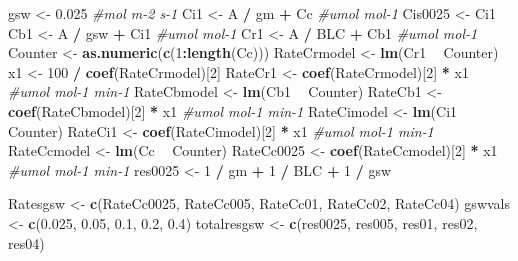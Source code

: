 \documentclass[
]{krantz}
\makeatletter
\newenvironment{Shaded}{\begin{snugshade}}{\end{snugshade}}
\newcommand{\CommentTok}[1]{\textcolor[rgb]{0.56,0.35,0.01}{\textit{#1}}}
\newcommand{\DecValTok}[1]{\textcolor[rgb]{0.00,0.00,0.81}{#1}}
\newcommand{\FloatTok}[1]{\textcolor[rgb]{0.00,0.00,0.81}{#1}}
\newcommand{\KeywordTok}[1]{\textcolor[rgb]{0.13,0.29,0.53}{\textbf{#1}}}
\newcommand{\NormalTok}[1]{#1}
\newcommand{\OperatorTok}[1]{\textcolor[rgb]{0.81,0.36,0.00}{\textbf{#1}}}
\newcommand{\StringTok}[1]{\textcolor[rgb]{0.31,0.60,0.02}{#1}}
\newenvironment{kframe}{%
\medskip{}
\setlength{\fboxsep}{.8em}
 \def\at@end@of@kframe{}%
 \ifinner\ifhmode%
  \def\at@end@of@kframe{\end{minipage}}%
  \begin{minipage}{\columnwidth}%
 \fi\fi%
 \def\FrameCommand##1{\hskip\@totalleftmargin \hskip-\fboxsep
 \colorbox{shadecolor}{##1}\hskip-\fboxsep
     \hskip-\linewidth \hskip-\@totalleftmargin \hskip\columnwidth}%
 \MakeFramed {\advance\hsize-\width
   \@totalleftmargin\z@ \linewidth\hsize
   \@setminipage}}%
 {\par\unskip\endMakeFramed%
 \at@end@of@kframe}
\renewenvironment{Shaded}{\begin{kframe}}{\end{kframe}}
\makeatother
\begin{document}
\begin{Shaded}
\begin{Highlighting}[]
\NormalTok{gsw <-}\StringTok{ }\FloatTok{0.025} \CommentTok{#mol m-2 s-1}
\NormalTok{Ci1 <-}\StringTok{ }\NormalTok{A }\OperatorTok{/}\StringTok{ }\NormalTok{gm }\OperatorTok{+}\StringTok{ }\NormalTok{Cc }\CommentTok{#umol mol-1}
\NormalTok{Cis0025 <-}\StringTok{ }\NormalTok{Ci1}
\NormalTok{Cb1 <-}\StringTok{ }\NormalTok{A }\OperatorTok{/}\StringTok{ }\NormalTok{gsw }\OperatorTok{+}\StringTok{ }\NormalTok{Ci1 }\CommentTok{#umol mol-1}
\NormalTok{Cr1 <-}\StringTok{ }\NormalTok{A }\OperatorTok{/}\StringTok{ }\NormalTok{BLC }\OperatorTok{+}\StringTok{ }\NormalTok{Cb1 }\CommentTok{#umol mol-1}
\NormalTok{Counter <-}\StringTok{ }\KeywordTok{as.numeric}\NormalTok{(}\KeywordTok{c}\NormalTok{(}\DecValTok{1}\OperatorTok{:}\KeywordTok{length}\NormalTok{(Cc)))}
\NormalTok{RateCrmodel <-}\StringTok{ }\KeywordTok{lm}\NormalTok{(Cr1 }\OperatorTok{~}\StringTok{ }\NormalTok{Counter)}
\NormalTok{x1 <-}\StringTok{ }\DecValTok{100} \OperatorTok{/}\StringTok{ }\KeywordTok{coef}\NormalTok{(RateCrmodel)[}\DecValTok{2}\NormalTok{]}
\NormalTok{RateCr1 <-}\StringTok{ }\KeywordTok{coef}\NormalTok{(RateCrmodel)[}\DecValTok{2}\NormalTok{] }\OperatorTok{*}\StringTok{ }\NormalTok{x1 }\CommentTok{#umol mol-1 min-1}
\NormalTok{RateCbmodel <-}\StringTok{ }\KeywordTok{lm}\NormalTok{(Cb1 }\OperatorTok{~}\StringTok{ }\NormalTok{Counter)}
\NormalTok{RateCb1 <-}\StringTok{ }\KeywordTok{coef}\NormalTok{(RateCbmodel)[}\DecValTok{2}\NormalTok{] }\OperatorTok{*}\StringTok{ }\NormalTok{x1 }\CommentTok{#umol mol-1 min-1}
\NormalTok{RateCimodel <-}\StringTok{ }\KeywordTok{lm}\NormalTok{(Ci1 }\OperatorTok{~}\StringTok{ }\NormalTok{Counter)}
\NormalTok{RateCi1 <-}\StringTok{ }\KeywordTok{coef}\NormalTok{(RateCimodel)[}\DecValTok{2}\NormalTok{] }\OperatorTok{*}\StringTok{ }\NormalTok{x1 }\CommentTok{#umol mol-1 min-1}
\NormalTok{RateCcmodel <-}\StringTok{ }\KeywordTok{lm}\NormalTok{(Cc }\OperatorTok{~}\StringTok{ }\NormalTok{Counter)}
\NormalTok{RateCc0025 <-}\StringTok{ }\KeywordTok{coef}\NormalTok{(RateCcmodel)[}\DecValTok{2}\NormalTok{] }\OperatorTok{*}\StringTok{ }\NormalTok{x1 }\CommentTok{#umol mol-1 min-1}
\NormalTok{res0025 <-}\StringTok{ }\DecValTok{1} \OperatorTok{/}\StringTok{ }\NormalTok{gm }\OperatorTok{+}\StringTok{ }\DecValTok{1} \OperatorTok{/}\StringTok{ }\NormalTok{BLC }\OperatorTok{+}\StringTok{ }\DecValTok{1} \OperatorTok{/}\StringTok{ }\NormalTok{gsw}

\NormalTok{Ratesgsw <-}\StringTok{ }\KeywordTok{c}\NormalTok{(RateCc0025, RateCc005, RateCc01, RateCc02, RateCc04)}
\NormalTok{gswvals <-}\StringTok{ }\KeywordTok{c}\NormalTok{(}\FloatTok{0.025}\NormalTok{, }\FloatTok{0.05}\NormalTok{, }\FloatTok{0.1}\NormalTok{, }\FloatTok{0.2}\NormalTok{, }\FloatTok{0.4}\NormalTok{)}
\NormalTok{totalresgsw <-}\StringTok{ }\KeywordTok{c}\NormalTok{(res0025, res005, res01, res02, res04)}


\end{Highlighting}
\end{Shaded}
\end{document}
